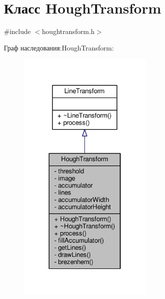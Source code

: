 \hypertarget{class_hough_transform}{}\section{Класс Hough\+Transform}
\label{class_hough_transform}


{\ttfamily \#include $<$houghtransform.\+h$>$}



Граф наследования\+:Hough\+Transform\+:
\nopagebreak
\begin{figure}[H]
\begin{center}
\leavevmode
\includegraphics[width=190pt]{d4/d8d/class_hough_transform__inherit__graph}
\end{center}
\end{figure}


